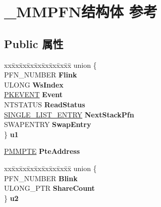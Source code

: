 \hypertarget{struct___m_m_p_f_n}{}\section{\+\_\+\+M\+M\+P\+F\+N结构体 参考}
\label{struct___m_m_p_f_n}
\subsection*{Public 属性}
\begin{DoxyCompactItemize}
\item 
\mbox{\label{struct___m_m_p_f_n_aadebe879b21a33b019f4cc48e298f75c}} 
\begin{tabbing}
xx\=xx\=xx\=xx\=xx\=xx\=xx\=xx\=xx\=\kill
union \{\\
\>PFN\_NUMBER {\bfseries Flink}\\
\>ULONG {\bfseries WsIndex}\\
\>\hyperlink{struct___k_e_v_e_n_t}{PKEVENT} {\bfseries Event}\\
\>NTSTATUS {\bfseries ReadStatus}\\
\>\hyperlink{struct___s_i_n_g_l_e___l_i_s_t___e_n_t_r_y}{SINGLE\_LIST\_ENTRY} {\bfseries NextStackPfn}\\
\>SWAPENTRY {\bfseries SwapEntry}\\
\} {\bfseries u1}\\

\end{tabbing}\item 
\mbox{\label{struct___m_m_p_f_n_a41217a6486b435da702536fcc18aa484}} 
\hyperlink{struct___m_m_p_t_e}{P\+M\+M\+P\+TE} {\bfseries Pte\+Address}
\item 
\mbox{\label{struct___m_m_p_f_n_a752a7fe03869ff51e98e6120666a1a78}} 
\begin{tabbing}
xx\=xx\=xx\=xx\=xx\=xx\=xx\=xx\=xx\=\kill
union \{\\
\>PFN\_NUMBER {\bfseries Blink}\\
\>ULONG\_PTR {\bfseries ShareCount}\\
\} {\bfseries u2}\\


\end{tabbing}
\end{DoxyCompactItemize}
